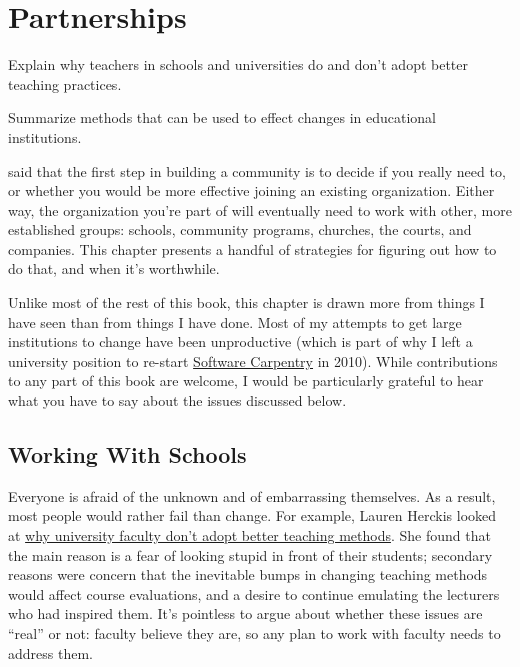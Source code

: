 \chapter{Partnerships}\label{s:partner}

\begin{objectives}

\item
  Explain why teachers in schools and universities do and don't adopt
  better teaching practices.

\item
  Summarize methods that can be used to effect changes in educational
  institutions.

\end{objectives}

 said that the first step in
building a community is to decide if you really need to, or whether
you would be more effective joining an existing organization.  Either
way, the organization you're part of will eventually need to work with
other, more established groups: schools, community programs, churches,
the courts, and companies.  This chapter presents a handful of
strategies for figuring out how to do that, and when it's worthwhile.

Unlike most of the rest of this book, this chapter is drawn more from
things I have seen than from things I have done.  Most of my attempts
to get large institutions to change have been unproductive (which is
part of why I left a university position to re-start
\href{http://carpentries.org}{Software Carpentry} in 2010).  While
contributions to any part of this book are welcome, I would be
particularly grateful to hear what you have to say about the issues
discussed below.

\section{Working With Schools}\label{s:partner-schools}

Everyone is afraid of the unknown and of embarrassing themselves. As a
result, most people would rather fail than change.  For example,
Lauren Herckis looked at
\href{https://www.insidehighered.com/news/2017/07/06/anthropologist-studies-why-professors-dont-adopt-innovative-teaching-methods}{why
  university faculty don't adopt better teaching methods}. She found
that the main reason is a fear of looking stupid in front of their
students; secondary reasons were concern that the inevitable bumps in
changing teaching methods would affect course evaluations, and a
desire to continue emulating the lecturers who had inspired them. It's
pointless to argue about whether these issues are ``real'' or not:
faculty believe they are, so any plan to work with faculty needs to
address them.

